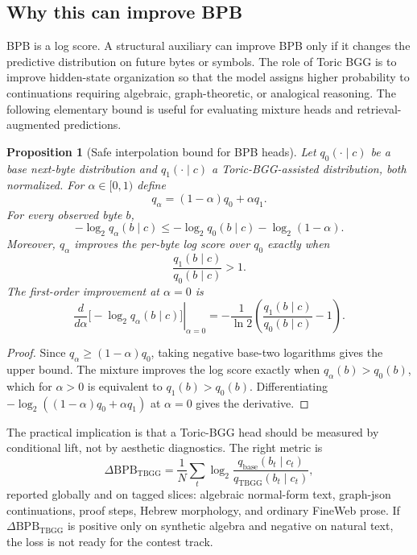 \documentclass[11pt]{article}
\theoremstyle{definition}
\theoremstyle{plain}
\newtheorem{proposition}[definition]{Proposition}
\theoremstyle{remark}
\numberwithin{equation}{section}
\begin{document}
\subsection{Why this can improve BPB}

BPB is a log score.  A structural auxiliary can improve BPB only if it changes the predictive distribution on future bytes or symbols.  The role of Toric BGG is to improve hidden-state organization so that the model assigns higher probability to continuations requiring algebraic, graph-theoretic, or analogical reasoning.  The following elementary bound is useful for evaluating mixture heads and retrieval-augmented predictions.

\begin{proposition}[Safe interpolation bound for BPB heads]\label{prop:bpb-mixture}
Let $q_0(\cdot\mid c)$ be a base next-byte distribution and $q_1(\cdot\mid c)$ a Toric-BGG-assisted distribution, both normalized.  For $\alpha\in[0,1)$ define
\begin{equation}
  q_\alpha=(1-\alpha)q_0+\alpha q_1.
\end{equation}
For every observed byte $b$,
\begin{equation}
  -\log_2 q_\alpha(b\mid c)\leq -\log_2 q_0(b\mid c)-\log_2(1-\alpha).
\end{equation}
Moreover, $q_\alpha$ improves the per-byte log score over $q_0$ exactly when
\begin{equation}
  \frac{q_1(b\mid c)}{q_0(b\mid c)}>1.
\end{equation}
The first-order improvement at $\alpha=0$ is
\begin{equation}
  \left.\frac{d}{d\alpha}\bigl[-\log_2 q_\alpha(b\mid c)\bigr]\right|_{\alpha=0}
  =-\frac{1}{\ln2}\left(\frac{q_1(b\mid c)}{q_0(b\mid c)}-1\right).
\end{equation}
\end{proposition}

\begin{proof}
Since $q_\alpha\geq(1-\alpha)q_0$, taking negative base-two logarithms gives the upper bound.  The mixture improves the log score exactly when $q_\alpha(b)>q_0(b)$, which for $\alpha>0$ is equivalent to $q_1(b)>q_0(b)$.  Differentiating $-\log_2((1-\alpha)q_0+\alpha q_1)$ at $\alpha=0$ gives the derivative.
\end{proof}

The practical implication is that a Toric-BGG head should be measured by conditional lift, not by aesthetic diagnostics.  The right metric is
\begin{equation}
  \Delta\mathrm{BPB}_{\mathrm{TBGG}}=\frac{1}{N}\sum_t\log_2\frac{q_{\mathrm{base}}(b_t\mid c_t)}{q_{\mathrm{TBGG}}(b_t\mid c_t)},
\end{equation}
reported globally and on tagged slices: algebraic normal-form text, graph-json continuations, proof steps, Hebrew morphology, and ordinary FineWeb prose.  If $\Delta\mathrm{BPB}_{\mathrm{TBGG}}$ is positive only on synthetic algebra and negative on natural text, the loss is not ready for the contest track.
\end{document}
